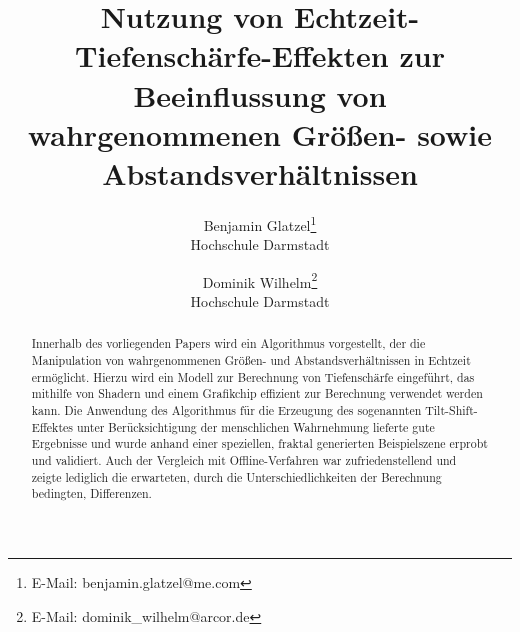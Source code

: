 \documentclass{acmsiggraph}                     %
\title{Nutzung von Echtzeit-Tiefenschärfe-Effekten zur Beeinflussung von wahrgenommenen Größen- sowie Abstandsverhältnissen}
\author{Benjamin Glatzel\thanks{E-Mail: benjamin.glatzel@me.com}\\ Hochschule Darmstadt
\and Dominik Wilhelm\thanks{E-Mail: dominik\_wilhelm@arcor.de}\\ Hochschule Darmstadt}
\begin{document}

\maketitle

\def\abstractname{Abstract}
\begin{abstract}

Innerhalb des vorliegenden Papers wird ein Algorithmus vorgestellt, der die Manipulation von wahrgenommenen Größen- und Abstandsverhältnissen in Echtzeit ermöglicht. Hierzu wird ein Modell zur Berechnung von Tiefenschärfe eingeführt, das mithilfe von Shadern und einem Grafikchip effizient zur Berechnung verwendet werden kann. Die Anwendung des Algorithmus für die Erzeugung des sogenannten Tilt-Shift-Effektes unter Berücksichtigung der menschlichen Wahrnehmung lieferte gute Ergebnisse und wurde anhand einer speziellen, fraktal generierten Beispielszene erprobt und validiert. Auch der Vergleich mit Offline-Verfahren war zufriedenstellend und zeigte lediglich die erwarteten, durch die Unterschiedlichkeiten der Berechnung bedingten, Differenzen.



\end{abstract}
\end{document}
